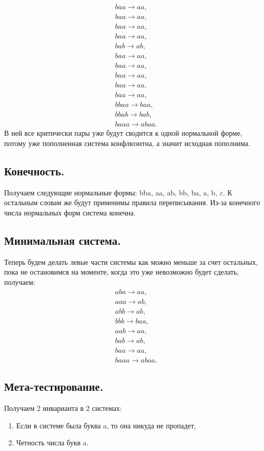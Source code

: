 \documentclass[12pt]{article}
\begin{document}
\begin{align*}
& baa \to aa, \\
& baa \to aa, \\
& baa \to aa, \\
& baa \to aa, \\
& bab \to ab, \\
& baa \to aa, \\
& baa \to aa, \\
& baa \to aa, \\
& baa \to aa, \\
& baa \to aa, \\
& bbaa \to baa, \\
& bbab \to bab, \\
& baaa \to abaa.
\end{align*}
В ней все критически пары уже будут сводится к одной нормальной форме, потому уже пополненная система конфлюэнтна, а значит исходная пополнима.

\subsection*{Конечность.}
Получаем следующие нормальные формы: bba, aa, ab, bb, ba, a, b, $\varepsilon$. К остальным словам же будут применимы правила переписывания. Из-за конечного числа нормальных форм система конечна.

\subsection*{Минимальная система.}
Теперь будем делать левые части системы как можно меньше за счет остальных, пока не остановимся на моменте, когда это уже невозможно будет сделать, получаем:
\begin{align*}
& aba \to aa, \\
& aaa \to ab, \\
& abb \to ab, \\
& bbb \to baa, \\
& aab \to aa, \\
& bab \to ab, \\
& baa \to aa, \\
& baaa \to abaa.
\end{align*}

\subsection*{Мета-тестирование.}
Получаем 2 инварианта в 2 системах:
\begin{enumerate}
    \item Если в системе была буква a, то она никуда не пропадет,
    \item Четность числа букв a.
\end{enumerate}
\end{document}
